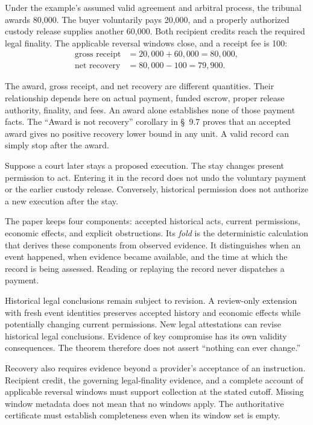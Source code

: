\documentclass{momentum}
\begin{document}
Under the example's assumed valid agreement and arbitral process, the tribunal awards 80,000. The buyer voluntarily pays 20,000, and a properly authorized custody release supplies another 60,000. Both recipient credits reach the required legal finality. The applicable reversal windows close, and a receipt fee is 100:
\[
\begin{aligned}
\text{gross receipt}&=20{,}000+60{,}000=80{,}000,\\
\text{net recovery}&=80{,}000-100=79{,}900.
\end{aligned}
\]

The award, gross receipt, and net recovery are different quantities. Their relationship depends here on actual payment, funded escrow, proper release authority, finality, and fees. An award alone establishes none of those payment facts. The ``Award is not recovery'' corollary in \S~9.7 proves that an accepted award gives no positive recovery lower bound in any unit. A valid record can simply stop after the award.

Suppose a court later stays a proposed execution. The stay changes present permission to act. Entering it in the record does not undo the voluntary payment or the earlier custody release. Conversely, historical permission does not authorize a new execution after the stay.

The paper keeps four components: accepted historical acts, current permissions, economic effects, and explicit obstructions. Its \emph{fold} is the deterministic calculation that derives these components from observed evidence. It distinguishes when an event happened, when evidence became available, and the time at which the record is being assessed. Reading or replaying the record never dispatches a payment.

Historical legal conclusions remain subject to revision. A review-only extension with fresh event identities preserves accepted history and economic effects while potentially changing current permissions. New legal attestations can revise historical legal conclusions. Evidence of key compromise has its own validity consequences. The theorem therefore does not assert ``nothing can ever change.''

Recovery also requires evidence beyond a provider's acceptance of an instruction. Recipient credit, the governing legal-finality evidence, and a complete account of applicable reversal windows must support collection at the stated cutoff. Missing window metadata does not mean that no windows apply. The authoritative certificate must establish completeness even when its window set is empty.
\end{document}
